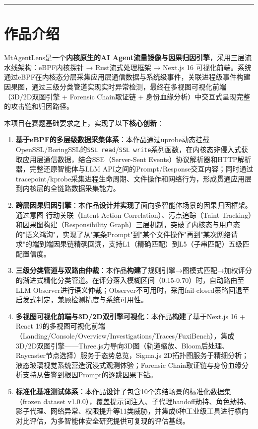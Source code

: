 \documentclass[a4paper]{ctexart}
\makeatletter
\renewcommand{\_}{%
  \ifmmode
    \nfss@text{\textunderscore}%
  \else
    \textunderscore\discretionary{}{}{}%
  \fi}
\makeatother
\begin{document}
\bigskip
\hrule
\bigskip


\section{作品介绍}



MtAgentLens是一个\textbf{内核原生的AI Agent流量镜像与因果归因引擎}，采用三层流水线架构：eBPF内核探针 → Rust流式处理框架 → Next.js 16 可视化前端。系统通过eBPF在内核态分层采集应用层通信数据与系统级事件，关联进程级事件构建因果图，通过三级分类管道实现实时异常检测，最终在多视图可视化前端（3D/2D双图引擎 + Forensic Chain取证链 + 身份血缘分析）中交互式呈现完整的攻击链和归因路径。


本项目在赛题基础要求之上，实现了以下\textbf{核心创新}：


\begin{enumerate}
\item \textbf{基于eBPF的多层级数据采集体系}：本作品通过uprobe动态挂载OpenSSL/BoringSSL的\texttt{SSL\_read}/\texttt{SSL\_write}系列函数，在内核态非侵入式获取应用层通信数据，结合SSE（Server-Sent Events）协议解析器和HTTP解析器，完整还原智能体与LLM API之间的Prompt/Response交互内容；同时通过tracepoint/kprobe采集进程生命周期、文件操作和网络行为，形成贯通应用层到内核层的全链路数据采集能力。

\item \textbf{跨层因果归因引擎}：本作品\textbf{设计并实现}了面向多智能体场景的因果归因框架。通过意图-行动关联（Intent-Action Correlation）、污点追踪（Taint Tracking）和因果图构建（Responsibility Graph）三层机制，突破了内核态与用户态的"语义鸿沟"，实现了从"某条Prompt"到"某个文件操作"再到"某次网络请求"的端到端因果链精确回溯，支持L1（精确匹配）到L5（子串匹配）五级匹配置信度。

\item \textbf{三级分类管道与双路由仲裁}：本作品\textbf{构建}了规则引擎→图模式匹配→加权评分的渐进式精化分类管道。在评分落入模糊区间（0.15-0.70）时，自动路由至LLM Observer进行语义仲裁；Observer不可用时，采用fail-closed策略回退至启发式判定，兼顾检测精度与系统可用性。

\item \textbf{多视图可视化前端与3D/2D双引擎可视化}：本作品\textbf{构建}了基于Next.js 16 + React 19的多视图可视化前端（Landing/Console/Overview/Investigations/Traces/FuxiBench），集成3D/2D双图引擎——Three.js力导向3D图（轨道缩放、Bloom后处理、Raycaster节点选择）服务于态势总览，Sigma.js 2D拓扑图服务于精细分析；液态玻璃视觉系统营造沉浸式观测体验；Forensic Chain取证链与身份血缘分析支持从告警到根因Prompt的逐跳因果下钻。

\item \textbf{标准化基准测试体系}：本作品\textbf{设计}了包含10个冻结场景的标准化数据集（frozen\_dataset v1.0.0），覆盖提示词注入、子代理handoff劫持、角色劫持、影子代理、网络异常、权限提升等11类威胁，并集成6种工业级工具进行横向对比评估，为多智能体安全研究提供可复现的评估基线。
\end{enumerate}
\end{document}
